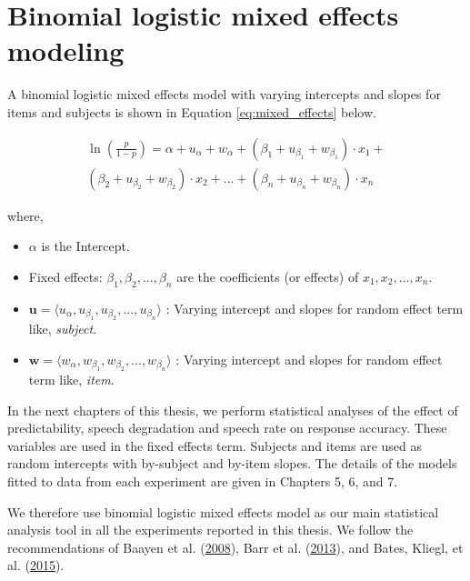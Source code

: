 \documentclass[a4paper, nobind]{templates/ociamthesis}
\providecommand{\tightlist}{%
  \setlength{\itemsep}{0pt}\setlength{\parskip}{0pt}}
\begin{document}
\hypertarget{binomial-logistic-mixed-effects-model}{%
\section{Binomial logistic mixed effects modeling}\label{binomial-logistic-mixed-effects-model}}

A binomial logistic mixed effects model with varying intercepts and slopes for items and subjects is shown in Equation \ref{eq:mixed_effects} below.

\begin{align} \label{eq:mixed_effects}
\ln (\frac{p}{1-p}) = \alpha + u_{\alpha} + w_{\alpha} +
                      (\beta_{1} + u_{\beta_{1}} + w_{\beta_{1}})\cdot {x_1} + \nonumber\\
                      (\beta_{2} + u_{\beta_{2}} + w_{\beta_{2}})\cdot {x_2} + ... +
                      (\beta_{n} + u_{\beta_{n}} + w_{\beta_{n}})\cdot {x_n} 
\end{align}

where,

\begin{itemize}
\tightlist
\item
  \(\alpha\) is the Intercept.
\item
  Fixed effects: \(\beta_{1}, \beta_{2}, ..., \beta_{n}\) are the coefficients (or effects) of \(x_1, x_2, ...,x_n\).
\item
  \(\boldsymbol{u} = \langle u_{\alpha}, u_{\beta_1}, u_{\beta_2}, ..., u_{\beta_n} \rangle\) : Varying intercept and slopes for random effect term like, \emph{subject}.
\item
  \(\boldsymbol{w} = \langle w_{\alpha}, w_{\beta_1}, w_{\beta_2}, ..., w_{\beta_n} \rangle\) : Varying intercept and slopes for random effect term like, \emph{item}.
\end{itemize}

In the next chapters of this thesis, we perform statistical analyses of the effect of predictability, speech degradation and speech rate on response accuracy.
These variables are used in the fixed effects term.
Subjects and items are used as random intercepts with by-subject and by-item slopes.
The details of the models fitted to data from each experiment are given in Chapters 5, 6, and 7.

We therefore use binomial logistic mixed effects model as our main statistical analysis tool in all the experiments reported in this thesis.
We follow the recommendations of Baayen et al. (\protect\hyperlink{ref-Baayen2008}{2008}), Barr et al. (\protect\hyperlink{ref-Barr2013}{2013}), and Bates, Kliegl, et al. (\protect\hyperlink{ref-Bates2015a}{2015}).
\end{document}
